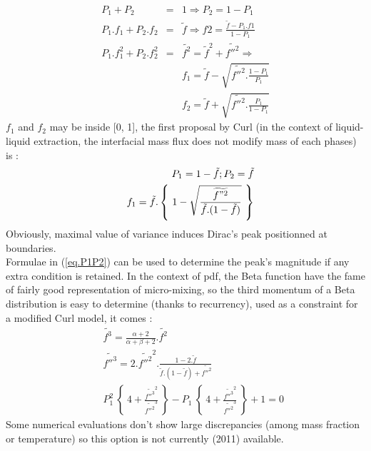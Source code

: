 \begin{eqnarray}
\label{eq.P1P2}
        P_1 + P_2 & = & 1 \Rightarrow P_2 = 1-P_1                                    \label{Eqs_xx1} \\
  P_1.f_1 + P_2.f_2 & = & \tilde{f}  \Rightarrow f2 = \frac{\tilde{f}-P_1.f1}{1-P_1}   \label{Eqs_xx2} \\
P_1.f_1^2+P_2.f_2^2 & = & \widetilde{f^2} = \tilde{f}^2+\widetilde{f{''}^2} \Rightarrow \label{Eqs_xx3} \\
                &   & f_1 = \tilde{f} - \sqrt{\widetilde{f{''}^2} . \frac{1-P_1}{P_1}} \label{Eqs_xx4} \\
                &   & f_2 = \tilde{f} + \sqrt{\widetilde{f{''}^2} . \frac{P_1}{1-P_1}} \label{Eqs_xx5}
\end{eqnarray}
$f_1$ and $f_2$ may be inside [0, 1], the first proposal by Curl (in the context
of liquid-liquid extraction, the interfacial mass flux does not modify mass of
each phases) is :
\begin{eqnarray}
&& P_1 = 1-\tilde{f} ; P_2=\tilde{f}                                                  \nonumber \\
&& f_1 = \tilde{f}.\left\{~ 1-\sqrt{\frac{\widetilde{f"^2}}{\tilde{f}.(1-\tilde{f})}} ~\right\} \label{Eqs_xx6}
\end{eqnarray} 
Obviously, maximal value of variance induces Dirac's peak positionned at boundaries.\\
Formulae in (\ref{eq.P1P2}) can be used to determine the peak's magnitude if any
extra condition is retained. In the context of pdf, the Beta function have the
fame of fairly good representation of micro-mixing, so the third momentum of a
Beta distribution is easy to determine (thanks to recurrency), used as a
constraint for a modified Curl model, it comes :
\begin{eqnarray}
&&\widetilde{f^3}     = \frac{\alpha +2}{\alpha+\beta+2} .\widetilde{f^2}  \label{Eqs_xx7}\\
&&\widetilde{f{''}^3} =2 . \widetilde{f{''}^2}^2 . \frac{1-2.\tilde{f}}{\tilde{f}.(1-\tilde{f})+\widetilde{f{''}^2}}  \label{Eqs_xx8}\\
&&P_1^2~\left\{~          4+\frac{\widetilde{f{''}^3}^2}{\widetilde{f{''}^2}^3}~\right\}
                 -P_1~\left\{~ 4+\frac{\widetilde{f{''}^3}^2}{\widetilde{f{''}^2}^3}~\right\}+1=0 \label{Eqs_xx9}
\end{eqnarray}   
Some numerical evaluations don't show large discrepancies ({\small among mass fraction or temperature}) so this option is not currently (2011) available.

